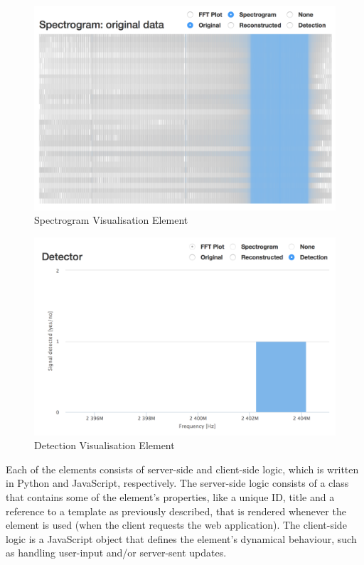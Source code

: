 \documentclass[a4paper, openany, oneside]{memoir}
\begin{document}
\begin{description}
\begin{figure}[H]
    \centering
    \includegraphics[width=\textwidth]{spectrogram.png}
    \caption{Spectrogram Visualisation Element}
    \label{fig:spectrogram_element}
\end{figure}

\begin{figure}[H]
    \centering
    \includegraphics[width=\textwidth]{detection.png}
    \caption{Detection Visualisation Element}
    \label{fig:detection_element}
\end{figure}

\end{description}

Each of the elements consists of server-side and client-side logic, which is written in Python and JavaScript, respectively. The server-side logic consists of a class that contains some of the element's properties, like a unique ID, title and a reference to a  template as previously described, that is rendered whenever the element is used (when the client requests the web application). The client-side logic is a JavaScript object that defines the element's dynamical behaviour, such as handling user-input and/or server-sent updates.
\end{document}
